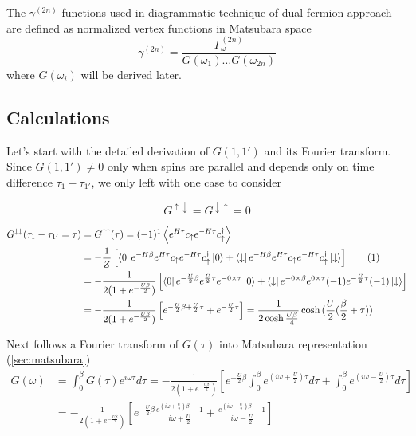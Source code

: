 The $\gamma^{(2n)}$-functions used in diagrammatic technique of dual-fermion approach are defined as normalized vertex functions in Matsubara space
\begin{equation} \gamma^{(2n)} = \frac{\Gamma_\omega^{(2n)}}{G(\omega_1)\dots G(\omega_{2n})} \end{equation}
where $G(\omega_i)$ will be derived later.

\subsection{Calculations}
Let's start with the detailed derivation of $G(1,1')$ and its Fourier transform.
Since $G(1,1')\neq0$ only when spins are parallel and depends only on time difference $\tau_1-\tau_{1'}$, we only left with one case to consider

\begin{equation}
 G^{\uparrow\downarrow} = G^{\downarrow\uparrow} = 0
\end{equation}

\begin{align*}
 \label{Gamma2}
 \stepcounter{equation}
 G^{\downarrow\downarrow}(\tau_1-\tau_{1'}=\tau) & = G^{\uparrow\uparrow}(\tau) = (-1)^1\left\langle e^{H\tau} c_\uparrow e^{-H\tau} c_\uparrow^\dagger\right\rangle \\
  & = 
  -\frac{1}{Z}\left[
    \bra{0}e^{-H\beta}e^{H\tau}c_\uparrow e^{-H\tau} c_\uparrow^\dagger\ket{0} +
    \bra{\downarrow}e^{-H\beta}e^{H\tau}c_\uparrow e^{-H\tau} c_\uparrow^\dagger\ket{\downarrow}
  \right] \tag{\theequation} \\
  & = -\frac{1}{2(1+e^{-\frac{U\beta}{2}})}\left[ 
    \bra{0}e^{-\frac{U}{2}\beta}e^{\frac{U}{2}\tau}e^{-0\times\tau}\ket{0} +
    \bra{\downarrow}e^{-0\times\beta}e^{0\times\tau}(-1)e^{-\frac{U}{2}\tau}(-1)\ket{\downarrow}
  \right] \\
  & = -\frac{1}{2(1+e^{-\frac{U\beta}{2}})}\left[
    e^{-\frac{U}{2}\beta+\frac{U}{2}\tau} + e^{-\frac{U}{2}\tau}
  \right] = \frac{1}{2\cosh{\frac{U\beta}{4}}}\cosh{(\frac{U}{2}(\frac{\beta}{2}+\tau))}
\end{align*}

Next follows a Fourier transform of $G(\tau)$ into Matsubara representation (\autoref{sec:matsubara}) 
\begin{equation}\begin{aligned}
 G(\omega) & = \int_0^\beta G(\tau) e^{i\omega\tau} d\tau
  = -\frac{1}{2(1+e^{-\frac{U\beta}{2}})}\left[ 
    e^{-\frac{U}{2}\beta}\int_0^\beta  e^{(i\omega+\frac{U}{2})\tau} d\tau + \int_0^\beta  e^{(i\omega-\frac{U}{2})\tau} d\tau
  \right] \\
 & = -\frac{1}{2(1+e^{-\frac{U\beta}{2}})}\left[
    e^{-\frac{U}{2}\beta} \frac{e^{(i\omega+\frac{U}{2})\beta}-1}{i\omega+\frac{U}{2}} + \frac{e^{(i\omega-\frac{U}{2})\beta}-1}{i\omega-\frac{U}{2}}
  \right]
\end{aligned}\end{equation}


